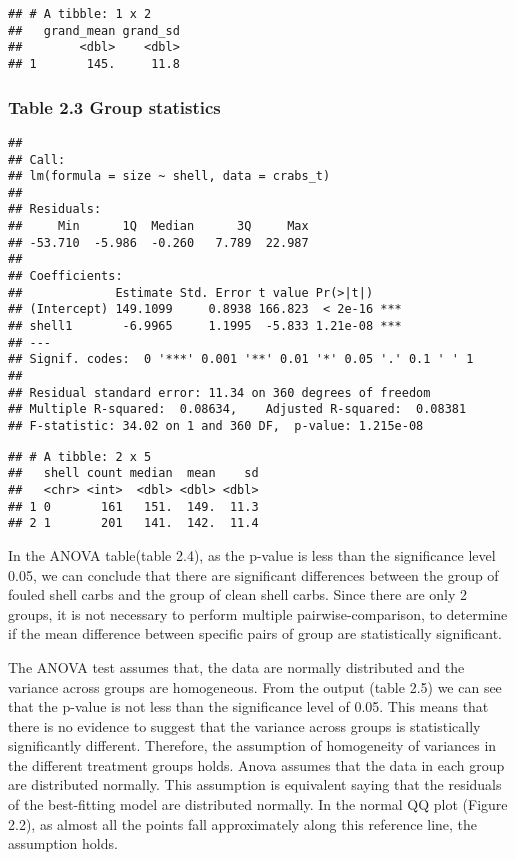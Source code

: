 \documentclass[]{article}
\begin{document}
\begin{verbatim}
## # A tibble: 1 x 2
##   grand_mean grand_sd
##        <dbl>    <dbl>
## 1       145.     11.8
\end{verbatim}

\subsubsection{Table 2.3 Group
statistics}\label{table-2.3-group-statistics}

\begin{verbatim}
## 
## Call:
## lm(formula = size ~ shell, data = crabs_t)
## 
## Residuals:
##     Min      1Q  Median      3Q     Max 
## -53.710  -5.986  -0.260   7.789  22.987 
## 
## Coefficients:
##             Estimate Std. Error t value Pr(>|t|)    
## (Intercept) 149.1099     0.8938 166.823  < 2e-16 ***
## shell1       -6.9965     1.1995  -5.833 1.21e-08 ***
## ---
## Signif. codes:  0 '***' 0.001 '**' 0.01 '*' 0.05 '.' 0.1 ' ' 1
## 
## Residual standard error: 11.34 on 360 degrees of freedom
## Multiple R-squared:  0.08634,    Adjusted R-squared:  0.08381 
## F-statistic: 34.02 on 1 and 360 DF,  p-value: 1.215e-08
\end{verbatim}

\begin{verbatim}
## # A tibble: 2 x 5
##   shell count median  mean    sd
##   <chr> <int>  <dbl> <dbl> <dbl>
## 1 0       161   151.  149.  11.3
## 2 1       201   141.  142.  11.4
\end{verbatim}

In the ANOVA table(table 2.4), as the p-value is less than the
significance level 0.05, we can conclude that there are significant
differences between the group of fouled shell carbs and the group of
clean shell carbs. Since there are only 2 groups, it is not necessary to
perform multiple pairwise-comparison, to determine if the mean
difference between specific pairs of group are statistically
significant.

The ANOVA test assumes that, the data are normally distributed and the
variance across groups are homogeneous. From the output (table 2.5) we
can see that the p-value is not less than the significance level of
0.05. This means that there is no evidence to suggest that the variance
across groups is statistically significantly different. Therefore, the
assumption of homogeneity of variances in the different treatment groups
holds. Anova assumes that the data in each group are distributed
normally. This assumption is equivalent saying that the residuals of the
best-fitting model are distributed normally. In the normal QQ plot
(Figure 2.2), as almost all the points fall approximately along this
reference line, the assumption holds.
\end{document}
